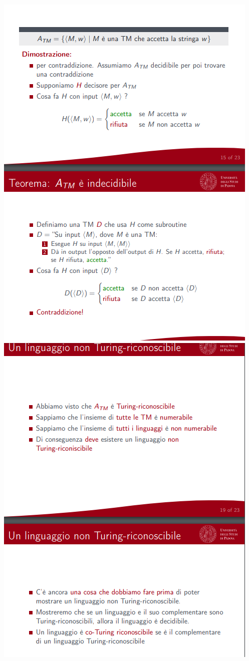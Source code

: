 \documentclass[]{article}
\begin{document}
\begin{center}
					\includegraphics[scale=0.8]{indecidibile5.png}
					\includegraphics[scale=0.8]{indecidibile6.png}

\end{center}
\end{document}
